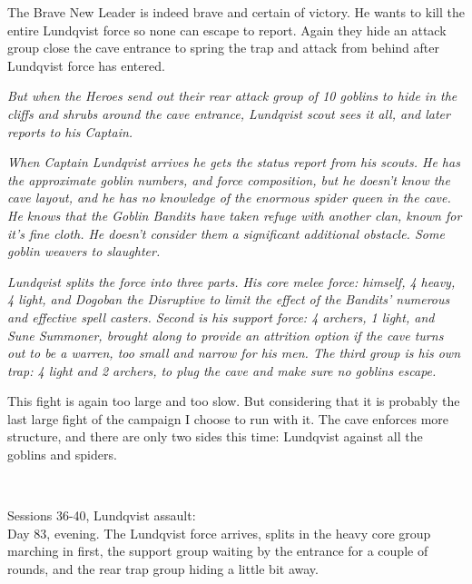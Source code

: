 The Brave New Leader is indeed brave and certain of victory. He wants to kill the entire Lundqvist force so none can escape to report. Again they hide an attack group close the cave entrance to spring the trap and attack from behind after Lundqvist force has entered.

\textit{But when the Heroes send out their rear attack group of 10 goblins to hide in the cliffs and shrubs around the cave entrance, Lundqvist scout sees it all, and later reports to his Captain.}

\textit{When Captain Lundqvist arrives he gets the status report from his scouts. He has the approximate goblin numbers, and force composition, but he doesn't know the cave layout, and he has no knowledge of the enormous spider queen in the cave. He knows that the Goblin Bandits have taken refuge with another clan, known for it's fine cloth. He doesn't consider them a significant additional obstacle. Some goblin weavers to slaughter.}

\textit{Lundqvist splits the force into three parts. His core melee force: himself, 4 heavy, 4 light, and Dogoban the Disruptive to limit the effect of the Bandits' numerous and effective spell casters. Second is his support force: 4 archers, 1 light, and Sune Summoner, brought along to provide an attrition option if the cave turns out to be a warren, too small and narrow for his men. The third group is his own trap: 4 light and 2 archers, to plug the cave and make sure no goblins escape.}


\begin{readoutloud}
This fight is again too large and too slow. But considering that it is probably the last large fight of the campaign I choose to run with it. The cave enforces more structure, and there are only two sides this time: Lundqvist against all the goblins and spiders.
\end{readoutloud}


\


Sessions 36-40, Lundqvist assault:\\
Day 83, evening. The Lundqvist force arrives, splits in the heavy core group marching in first, the support group waiting by the entrance for a couple of rounds, and the rear trap group hiding a little bit away.

